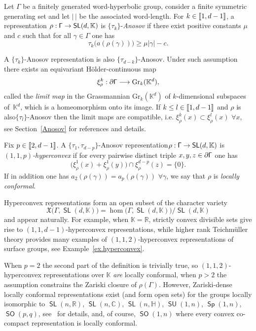 \documentclass[AHL,Unicode,longabstracts,MathTools]{cedram}
\newcommand{\grass}{\mathrm{Gr}}
\newcommand{\cartan}{a}
\DeclareMathOperator{\SL}{{\mathsf{SL}}}
\DeclareMathOperator{\SO}{{\mathsf{SO}}}
\DeclareMathOperator{\Sp}{\mathsf{Sp}}
\DeclareMathOperator{\SU}{\mathsf{SU}}
\renewcommand{\sf}[1]{{\mathsf{#1}}}
\newcommand{\G}{\sf{\Gamma}}
\newcommand{\R}{\mathbb{R}}
\newcommand{\C}{\mathbb{C}}
\renewcommand{\H}{\mathbb{H}}
\newcommand{\K}{\mathbb{K}}
\newcommand{\g}{\gamma}
\newcommand{\bord}{\partial}
\newcommand{\slroot}{{\tau}}
\renewcommand{\/}{\backslash}
\newcommand{\<}{\langle}
\renewcommand{\>}{\rangle}
\newcommand{\fkX}{\mathfrak{X}}
\renewcommand*{\to}{\mathchoice{\longrightarrow}{\rightarrow}{\rightarrow}{\rightarrow}}
\let\oldforall\forall
\renewcommand*{\forall}{\mathrel{\oldforall}}
\newcommand{\llbracket}{\mathopen{[\mkern -2.7mu[}}
\newcommand{\rrbracket}{\mathclose{]\mkern -2.7mu]}}
\newcommand{\lb}{\llbracket}
\newcommand{\rb}{\rrbracket}
\begin{document}
Let $\G$ be a finitely generated word-hyperbolic group, consider a finite symmetric generating set and let $|\,|$ be the associated word-length. For $k\in\lb1,d-1\rb$, a representation $\rho:\G\to\SL(d,\K)$ is $\{\slroot_k\}$-\emph{Anosov} if there exist positive constants $\mu$ and $c$ such that for all $\g\in\G$ one has
\[
\slroot_k\bigl(\cartan(\rho(\g))\bigr)\geq\mu|\g|-c.
\]

A $\{\slroot_k\}$-{Anosov} representation is also $\{\slroot_{d-k}\}$-Anosov. Under such assumption there exists an equivariant H\"older-continuous map
\[
\xi^{k}_\rho:\bord\G\to\grass_k(\K^d),
\]
called the \emph{limit map} in the Grassmannian $\grass_k(\K^d)$ of $k$-dimensional subspaces of~$\K^d$, which is a homeomorphism onto its image. If $k\leq l\in\lb1,d-1\rb$ and $\rho$ is also\linebreak $\{\slroot_l\}$-Anosov then the limit maps are {compatible}, i.e. $\xi^k_\rho(x)\subset\xi^l_\rho(x)$ $\forall x$, see Section~\ref{Anosov} for references and details.

\begin{defi}\label{d.hyp}
Fix $p\in\lb2,d-1\rb$. A $\{\slroot_1,\slroot_{d-p}\}$-Anosov representation\linebreak $\rho:\G\to\SL(d,\K)$ is \emph{$(1,1,p)$-hyperconvex} if for every pairwise distinct triple $x,y,\linebreak z\in\bord\G$ one has
\begin{equation}\label{hypdefi}
\bigl(\xi^{1}_\rho(x)+\xi^{1}_\rho(y)\bigr)\cap\xi^{{d-p}}_\rho(z)=\{0\}.
\end{equation}
If in addition one has $\cartan_2(\rho(\g))=\cartan_{p}(\rho(\g))$ $\forall\g$, we say that $\rho$ is \emph{locally conformal}.
\end{defi}

Hyperconvex representations form an open subset of the character variety
\[
\fkX\bigl(\G,\SL(d,\K)\bigr)=\hom\bigl(\G,\SL(d,\K)\bigr)/\SL(d,\K)
\]
and appear naturally. For example, when $\K=\R$, strictly convex divisible sets give rise to $(1,1,d-1)$-hyperconvex representations, while higher rank Teichm\"uller theory provides many examples of $(1,1,2)$-hyperconvex representations of surface groups, see Example~\ref{ex.hyperconvex}.


When $p=2$ the second part of the definition is trivially true, so $(1,1,2)$-hypercon\-vex representations over $\K$ \emph{are} locally conformal, when $p>2$ the assumption constrains the Zariski closure of $\rho(\G)$. However, Zariski-dense locally conformal representations exist (and form open sets) for the groups locally isomorphic to $\SL(n,\R)$, $\SL(n,\C)$, $\SL(n,\H)$, $\SU(1,n)$, $\Sp(1,n)$, $\SO(p,q)$, see~\cite[Section~8]{PSW1} %
for details, and, of course, $\SO(1,n)$ where every convex co-compact representation is locally conformal.
\end{document}
